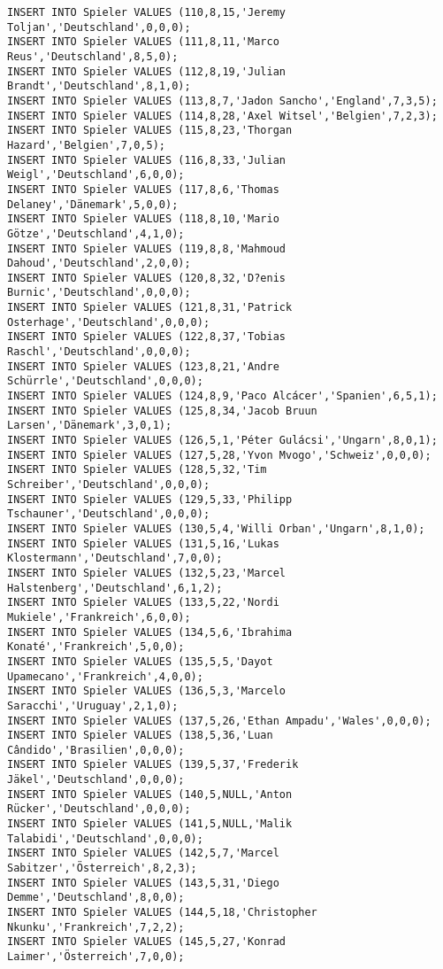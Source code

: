 \documentclass{lehramt-informatik-aufgabe}
\begin{document}
\begin{verbatim}
INSERT INTO Spieler VALUES (110,8,15,'Jeremy Toljan','Deutschland',0,0,0);
INSERT INTO Spieler VALUES (111,8,11,'Marco Reus','Deutschland',8,5,0);
INSERT INTO Spieler VALUES (112,8,19,'Julian Brandt','Deutschland',8,1,0);
INSERT INTO Spieler VALUES (113,8,7,'Jadon Sancho','England',7,3,5);
INSERT INTO Spieler VALUES (114,8,28,'Axel Witsel','Belgien',7,2,3);
INSERT INTO Spieler VALUES (115,8,23,'Thorgan Hazard','Belgien',7,0,5);
INSERT INTO Spieler VALUES (116,8,33,'Julian Weigl','Deutschland',6,0,0);
INSERT INTO Spieler VALUES (117,8,6,'Thomas Delaney','Dänemark',5,0,0);
INSERT INTO Spieler VALUES (118,8,10,'Mario Götze','Deutschland',4,1,0);
INSERT INTO Spieler VALUES (119,8,8,'Mahmoud Dahoud','Deutschland',2,0,0);
INSERT INTO Spieler VALUES (120,8,32,'D?enis Burnic','Deutschland',0,0,0);
INSERT INTO Spieler VALUES (121,8,31,'Patrick Osterhage','Deutschland',0,0,0);
INSERT INTO Spieler VALUES (122,8,37,'Tobias Raschl','Deutschland',0,0,0);
INSERT INTO Spieler VALUES (123,8,21,'Andre Schürrle','Deutschland',0,0,0);
INSERT INTO Spieler VALUES (124,8,9,'Paco Alcácer','Spanien',6,5,1);
INSERT INTO Spieler VALUES (125,8,34,'Jacob Bruun Larsen','Dänemark',3,0,1);
INSERT INTO Spieler VALUES (126,5,1,'Péter Gulácsi','Ungarn',8,0,1);
INSERT INTO Spieler VALUES (127,5,28,'Yvon Mvogo','Schweiz',0,0,0);
INSERT INTO Spieler VALUES (128,5,32,'Tim Schreiber','Deutschland',0,0,0);
INSERT INTO Spieler VALUES (129,5,33,'Philipp Tschauner','Deutschland',0,0,0);
INSERT INTO Spieler VALUES (130,5,4,'Willi Orban','Ungarn',8,1,0);
INSERT INTO Spieler VALUES (131,5,16,'Lukas Klostermann','Deutschland',7,0,0);
INSERT INTO Spieler VALUES (132,5,23,'Marcel Halstenberg','Deutschland',6,1,2);
INSERT INTO Spieler VALUES (133,5,22,'Nordi Mukiele','Frankreich',6,0,0);
INSERT INTO Spieler VALUES (134,5,6,'Ibrahima Konaté','Frankreich',5,0,0);
INSERT INTO Spieler VALUES (135,5,5,'Dayot Upamecano','Frankreich',4,0,0);
INSERT INTO Spieler VALUES (136,5,3,'Marcelo Saracchi','Uruguay',2,1,0);
INSERT INTO Spieler VALUES (137,5,26,'Ethan Ampadu','Wales',0,0,0);
INSERT INTO Spieler VALUES (138,5,36,'Luan Cândido','Brasilien',0,0,0);
INSERT INTO Spieler VALUES (139,5,37,'Frederik Jäkel','Deutschland',0,0,0);
INSERT INTO Spieler VALUES (140,5,NULL,'Anton Rücker','Deutschland',0,0,0);
INSERT INTO Spieler VALUES (141,5,NULL,'Malik Talabidi','Deutschland',0,0,0);
INSERT INTO Spieler VALUES (142,5,7,'Marcel Sabitzer','Österreich',8,2,3);
INSERT INTO Spieler VALUES (143,5,31,'Diego Demme','Deutschland',8,0,0);
INSERT INTO Spieler VALUES (144,5,18,'Christopher Nkunku','Frankreich',7,2,2);
INSERT INTO Spieler VALUES (145,5,27,'Konrad Laimer','Österreich',7,0,0);

\end{verbatim}
\end{document}

